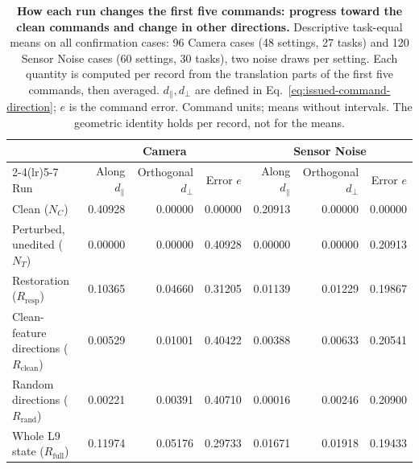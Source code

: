 \begin{table}[t]
\caption{\textbf{How each run changes the first five commands: progress toward the clean commands and change in other directions.} Descriptive task-equal means on all confirmation cases: 96 Camera cases (48 settings, 27 tasks) and 120 Sensor Noise cases (60 settings, 30 tasks), two noise draws per setting. Each quantity is computed per record from the translation parts of the first five commands, then averaged. $d_\parallel,d_\perp$ are defined in Eq.~\ref{eq:issued-command-direction}; $e$ is the command error. Command units; means without intervals. The geometric identity holds per record, not for the means.}

\centering\small
\begin{tabular}{lrrrrrr}\toprule
& \multicolumn{3}{c}{Camera} & \multicolumn{3}{c}{Sensor Noise}\\
\cmidrule(lr){2-4}\cmidrule(lr){5-7}
Run & Along $d_\parallel$ & Orthogonal $d_\perp$ & Error $e$ & Along $d_\parallel$ & Orthogonal $d_\perp$ & Error $e$\\\midrule
Clean ($N_C$) & 0.40928 & 0.00000 & 0.00000 & 0.20913 & 0.00000 & 0.00000\\
Perturbed, unedited ($N_T$) & 0.00000 & 0.00000 & 0.40928 & 0.00000 & 0.00000 & 0.20913\\
\midrule
Restoration ($R_{\mathrm{resp}}$) & 0.10365 & 0.04660 & 0.31205 & 0.01139 & 0.01229 & 0.19867\\
Clean-feature directions ($R_{\mathrm{clean}}$) & 0.00529 & 0.01001 & 0.40422 & 0.00388 & 0.00633 & 0.20541\\
Random directions ($R_{\mathrm{rand}}$) & 0.00221 & 0.00391 & 0.40710 & 0.00016 & 0.00246 & 0.20900\\
Whole L9 state ($R_{\mathrm{full}}$) & 0.11974 & 0.05176 & 0.29733 & 0.01671 & 0.01918 & 0.19433\\
\bottomrule\end{tabular}

\label{tab:issued-command-direction}
\end{table}
